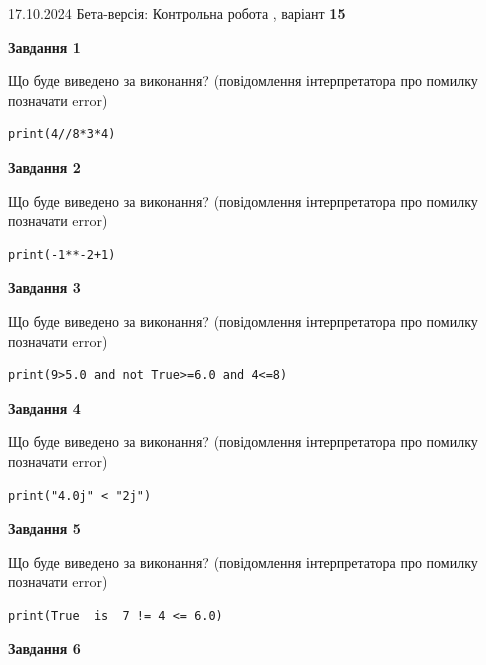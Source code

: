 \documentclass[12pt, ukrainian]{article}
\begin{document}
{\Large{17.10.2024 Бета-версія: Контрольна робота , варіант  \No \textbf { 15 }\par}}
{
\begin {large}
{\begin {center}\textbf{Завдання 1}\end {center}}

Що буде виведено за виконання? (повідомлення інтерпретатора про помилку позначати error)\par
\begin{verbatim}
print(4//8*3*4)
\end{verbatim}

{\begin {center}\textbf{Завдання 2}\end {center}}

Що буде виведено за виконання? (повідомлення інтерпретатора про помилку позначати error)\par
\begin{verbatim}
print(-1**-2+1)
\end{verbatim}

{\begin {center}\textbf{Завдання 3}\end {center}}

Що буде виведено за виконання? (повідомлення інтерпретатора про помилку позначати error)\par
\begin{verbatim}
print(9>5.0 and not True>=6.0 and 4<=8)
\end{verbatim}

{\begin {center}\textbf{Завдання 4}\end {center}}

Що буде виведено за виконання? (повідомлення інтерпретатора про помилку позначати error)\par
\begin{verbatim}
print("4.0j" < "2j")
\end{verbatim}

{\begin {center}\textbf{Завдання 5}\end {center}}

Що буде виведено за виконання? (повідомлення інтерпретатора про помилку позначати error)\par
\begin{verbatim}
print(True  is  7 != 4 <= 6.0)
\end{verbatim}

{\begin {center}\textbf{Завдання 6}\end {center}}


\end{large}}
\end{document}
